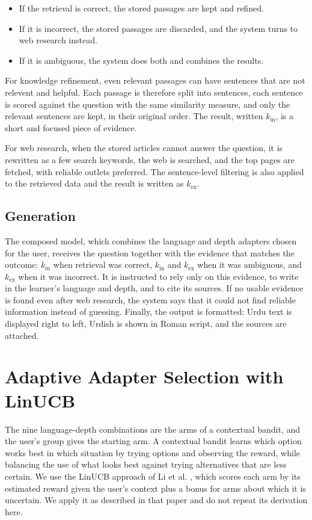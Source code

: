 \documentclass{FastFyp}
\begin{document}
\begin{itemize}
  \item If the retrieval is correct, the stored passages are kept and refined.
  \item If it is incorrect, the stored passages are discarded, and the system turns to web research instead.
  \item If it is ambiguous, the system does both and combines the results.
\end{itemize}

For knowledge refinement, even relevant passages can have sentences that are not relevent and helpful. Each passage is therefore split into sentences, each sentence is scored against the question with the same similarity measure, and only the relevant sentences are kept, in their original order. The result, written $k_{\mathrm{in}}$, is a short and focused piece of evidence.

For web research, when the stored articles cannot answer the question, it is rewritten as a few search keywords, the web is searched, and the top pages are fetched, with reliable outlets preferred. The sentence-level filtering is also applied to the retrieved data and the result is written as $k_{\mathrm{ex}}$.

\subsection{Generation}
The composed model, which combines the language and depth adapters chosen for the user, receives the question together with the evidence that matches the outcome: $k_{\mathrm{in}}$ when retrieval was correct, $k_{\mathrm{in}}$ and $k_{\mathrm{ex}}$ when it was ambiguous, and $k_{\mathrm{ex}}$ when it was incorrect. It is instructed to rely only on this evidence, to write in the learner's language and depth, and to cite its sources. If no usable evidence is found even after web research, the system says that it could not find reliable information instead of guessing. Finally, the output is formatted: Urdu text is displayed right to left, Urdish is shown in Roman script, and the sources are attached.


\section{Adaptive Adapter Selection with LinUCB}
\label{sec:bandit}
The nine language-depth combinations are the arms of a contextual bandit, and the user's group gives the starting arm. A contextual bandit learns which option works best in which situation by trying options and observing the reward, while balancing the use of what looks best against trying alternatives that are less certain. We use the LinUCB approach of Li et al. \cite{li2010contextual}, which scores each arm by its estimated reward given the user's context plus a bonus for arms about which it is uncertain. We apply it as described in that paper and do not repeat its derivation here.
\end{document}
